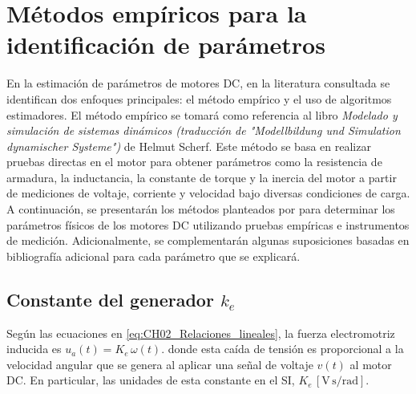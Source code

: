 \section{Métodos empíricos para la identificación de parámetros}
En la estimación de parámetros de motores \ac{DC}, en la literatura consultada se identifican dos enfoques principales: el método empírico y el uso de algoritmos estimadores. El método empírico se tomará como referencia al libro \textit{Modelado y simulación de sistemas dinámicos (traducción de "Modellbildung und Simulation dynamischer Systeme")} de Helmut Scherf. Este método se basa en realizar pruebas directas en el motor para obtener parámetros como la resistencia de armadura, la inductancia, la constante de torque y la inercia del motor a partir de mediciones de voltaje, corriente y velocidad bajo diversas condiciones de carga. 
A continuación, se presentarán los métodos planteados por \cite{libro_aleman} para determinar los parámetros físicos de los motores \ac{DC} utilizando pruebas empíricas e instrumentos de medición. Adicionalmente, se complementarán algunas suposiciones basadas en bibliografía adicional para cada parámetro que se explicará.
    \subsection{Constante del generador $k_e$}
         Según las ecuaciones en \ref{eq:CH02_Relaciones_lineales}, la fuerza electromotriz inducida es $u_a(t)=K_e\,\omega(t)$. donde esta caída de tensión es proporcional a la velocidad angular que se genera al aplicar una señal de voltaje $v(t)$ al motor \ac{DC}. En particular, las unidades de esta constante en el \ac{SI}, $K_e\,[\mathrm{V\,s/rad}]$.
        
